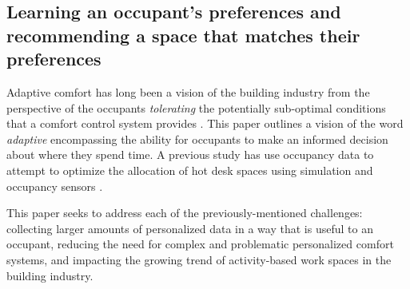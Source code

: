 \documentclass[]{interact}
\theoremstyle{plain}%
\theoremstyle{definition}
\theoremstyle{remark}
\begin{document}
\subsection{Learning an occupant’s preferences and recommending a space that matches their preferences}
Adaptive comfort has long been a vision of the building industry from the perspective of the occupants \emph{tolerating} the potentially sub-optimal conditions that a comfort control system provides \citep{Nicol2013AdaptiveWorld}. This paper outlines a vision of the word \emph{adaptive} encompassing the ability for occupants to make an informed decision about where they spend time. A previous study has use occupancy data to attempt to optimize the allocation of hot desk spaces using simulation and occupancy sensors \citep{Cooper2017AnData}.

This paper seeks to address each of the previously-mentioned challenges: collecting larger amounts of personalized data in a way that is useful to an occupant, reducing the need for complex and problematic personalized comfort systems, and impacting the growing trend of activity-based work spaces in the building industry. 
\end{document}
